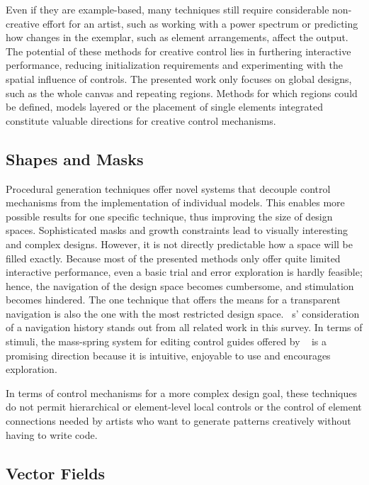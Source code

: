 Even if they are example-based, many techniques still require considerable non-creative effort for an artist, such as working with a power spectrum or predicting how changes in the exemplar, such as element arrangements, affect the output. The potential of these methods for creative control lies in furthering interactive performance, reducing initialization requirements and experimenting with the spatial influence of controls. The presented work only focuses on global designs, such as the whole canvas and repeating regions. Methods for which regions could be defined, models layered or the placement of single elements integrated constitute valuable directions for creative control mechanisms.


\subsection{Shapes and Masks}
\label{subsubsec:analysis_creative_means_shapes}

Procedural generation techniques offer novel systems that decouple control mechanisms from the implementation of individual models. This enables more possible results for one specific technique, thus improving the size of design spaces. 
Sophisticated masks and growth constraints lead to visually interesting and complex designs. However, it is not directly predictable how a space will be filled exactly. Because most of the presented methods only offer quite limited interactive performance, even a basic trial and error exploration is hardly feasible; hence, the navigation of the design space becomes cumbersome, and stimulation becomes hindered. The one technique \cite{santoni_2016_ggp} that offers the means for a transparent navigation is also the one with the most restricted design space. \citeauthor*{santoni_2016_ggp}~\cite{santoni_2016_ggp}s' consideration of a navigation history stands out from all related work in this survey. In terms of stimuli, the mass-spring system for editing control guides offered by \citeauthor*{benes_2011_gpm}~\cite{benes_2011_gpm} is a promising direction because it is intuitive, enjoyable to use and encourages exploration.

In terms of control mechanisms for a more complex design goal, these techniques do not permit hierarchical or element-level local controls or the control of element connections needed by artists who want to generate patterns creatively without having to write code.


\subsection{Vector Fields}
\label{subsubsec:analysis_creative_means_fields}

